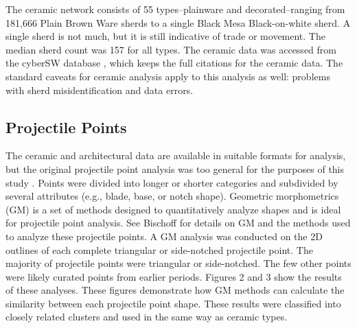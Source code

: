 \documentclass[]{interact}
\theoremstyle{plain}%
\theoremstyle{definition}
\theoremstyle{remark}
\begin{document}
The ceramic network consists of 55 types--plainware and
decorated--ranging from 181,666 Plain Brown Ware sherds to a single
Black Mesa Black-on-white sherd. A single sherd is not much, but it is
still indicative of trade or movement. The median sherd count was 157
for all types. The ceramic data was accessed from the cyberSW database
\citep{Mills2020-tb}, which keeps the full citations for the ceramic
data. The standard caveats for ceramic analysis apply to this analysis
as well: problems with sherd misidentification and data errors.

\hypertarget{projectile-points}{%
\subsection*{Projectile Points}\label{projectile-points}}

The ceramic and architectural data are available in suitable formats for
analysis, but the original projectile point analysis was too general for
the purposes of this study \citep[see][ for details]{Rice1994-rk}.
Points were divided into longer or shorter categories and subdivided by
several attributes (e.g., blade, base, or notch shape). Geometric
morphometrics (GM) is a set of methods designed to quantitatively
analyze shapes and is ideal for projectile point analysis. See Bischoff
\citeyearpar{Bischoff2022-rg} for details on GM and the methods used to
analyze these projectile points. A GM analysis was conducted on the 2D
outlines of each complete triangular or side-notched projectile point.
The majority of projectile points were triangular or side-notched. The
few other points were likely curated points from earlier periods.
Figures 2 and 3 show the results of these analyses. These figures
demonstrate how GM methods can calculate the similarity between each
projectile point shape. These results were classified into closely
related clusters and used in the same way as ceramic types.
\end{document}
